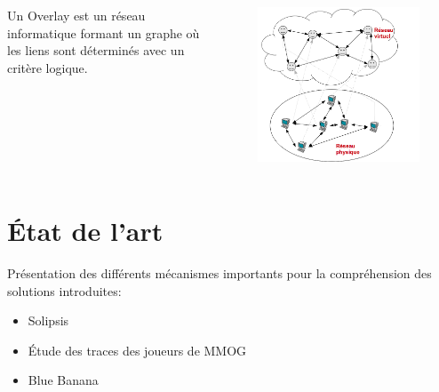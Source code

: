 \documentclass{beamer}
\begin{document}
  \begin{frame}
	
 	\begin{columns}
          \begin{column}{5cm}
          	Un Overlay est un réseau informatique formant un graphe où les liens sont déterminés avec un critère logique.\\
	  \end{column}
          \begin{column}{5cm}
        	\begin{figure}
        	  \includegraphics[scale=0.2]{./Ressources/Images/overlay.png}\\
        	  \label{Propa_Algo}
        	\end{figure}
          \end{column}
        \end{columns}
	
  \end{frame}
	
  \section{État de l'art}
  \begin{frame}
	Présentation des différents mécanismes importants pour la compréhension des solutions introduites:\\
	\begin{itemize}
		\item Solipsis\\
		\item Étude des traces des joueurs de MMOG\\
		\item Blue Banana \\
	\end{itemize}
  \end{frame}
\end{document}
